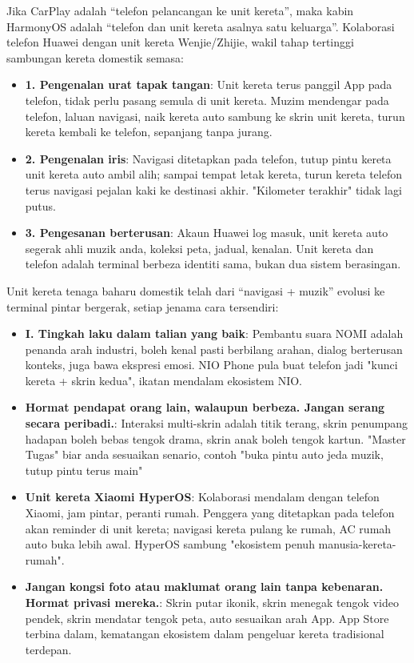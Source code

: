 
Jika CarPlay adalah “telefon pelancangan ke unit kereta”, maka kabin HarmonyOS adalah “telefon dan unit kereta asalnya satu keluarga”. Kolaborasi telefon Huawei dengan unit kereta Wenjie/Zhijie, wakil tahap tertinggi sambungan kereta domestik semasa:

\begin{itemize}
  \item \textbf{1. Pengenalan urat tapak tangan}: Unit kereta terus panggil App pada telefon, tidak perlu pasang semula di unit kereta. Muzim mendengar pada telefon, laluan navigasi, naik kereta auto sambung ke skrin unit kereta, turun kereta kembali ke telefon, sepanjang tanpa jurang.
  \item \textbf{2. Pengenalan iris}: Navigasi ditetapkan pada telefon, tutup pintu kereta unit kereta auto ambil alih; sampai tempat letak kereta, turun kereta telefon terus navigasi pejalan kaki ke destinasi akhir. "Kilometer terakhir" tidak lagi putus.
  \item \textbf{3. Pengesanan berterusan}: Akaun Huawei log masuk, unit kereta auto segerak ahli muzik anda, koleksi peta, jadual, kenalan. Unit kereta dan telefon adalah terminal berbeza identiti sama, bukan dua sistem berasingan.
\end{itemize}


Unit kereta tenaga baharu domestik telah dari “navigasi + muzik” evolusi ke terminal pintar bergerak, setiap jenama cara tersendiri:

\begin{itemize}
  \item \textbf{I. Tingkah laku dalam talian yang baik}: Pembantu suara NOMI adalah penanda arah industri, boleh kenal pasti berbilang arahan, dialog berterusan konteks, juga bawa ekspresi emosi. NIO Phone pula buat telefon jadi "kunci kereta + skrin kedua", ikatan mendalam ekosistem NIO.
  \item \textbf{Hormat pendapat orang lain, walaupun berbeza. Jangan serang secara peribadi.}: Interaksi multi-skrin adalah titik terang, skrin penumpang hadapan boleh bebas tengok drama, skrin anak boleh tengok kartun. "Master Tugas" biar anda sesuaikan senario, contoh "buka pintu auto jeda muzik, tutup pintu terus main"
  \item \textbf{Unit kereta Xiaomi HyperOS}: Kolaborasi mendalam dengan telefon Xiaomi, jam pintar, peranti rumah. Penggera yang ditetapkan pada telefon akan reminder di unit kereta; navigasi kereta pulang ke rumah, AC rumah auto buka lebih awal. HyperOS sambung "ekosistem penuh manusia-kereta-rumah".
  \item \textbf{Jangan kongsi foto atau maklumat orang lain tanpa kebenaran. Hormat privasi mereka.}: Skrin putar ikonik, skrin menegak tengok video pendek, skrin mendatar tengok peta, auto sesuaikan arah App. App Store terbina dalam, kematangan ekosistem dalam pengeluar kereta tradisional terdepan.
\end{itemize}

